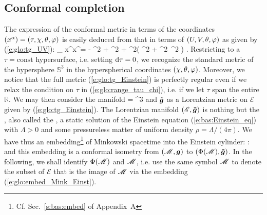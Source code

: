 \subsection{Conformal completion} \label{s:glo:conf_complet_Mink}

The expression of the conformal metric in terms of the coordinates
$(x^\alpha) = (\tau,\chi,\theta,\varphi)$ is easily deduced from that in terms of
$(U,V,\theta,\varphi)$ as given by (\ref{e:glo:tg_UV}):
\be \label{e:glo:tg_Einstein}
    _{\mu\nu} \D x^\mu \D x^\nu =  - \D\tau^2
        + \D \chi^2
        + \sin^2\chi \left(  \D\th^2 + \sin^2\th \, \D\ph^2 \right) .
\ee
Restricting to a $\tau = \mathrm{const}$ hypersurface, i.e. setting $\mathrm{d}\tau=0$,
we recognize the standard metric of the hypersphere
$\mathbb{S}^3$ in the hyperspherical coordinates $(\chi,\theta,\varphi)$.
Moreover, we notice that the full metric (\ref{e:glo:tg_Einstein})
is perfectly regular even if we relax
the condition on $\tau$ in (\ref{e:glo:range_tau_chi}), i.e. if we
let $\tau$ span the
entire $\mathbb{R}$. We may then consider the manifold
\be
     = \times {}^3
\ee
and $\bm{\tilde{g}}$ as a Lorentzian metric on $\mathscr{E}$ given by
(\ref{e:glo:tg_Einstein}).
The Lorentzian manifold
$(\mathscr{E},\bm{\tilde{g}})$ is nothing but the
, also called the ,
a static solution of the Einstein equation (\ref{e:bas:Einstein_eq})
with $\Lambda > 0$ and some pressureless matter of uniform density
$\rho = \Lambda/(4\pi)$.
We have thus an embedding\footnote{Cf. Sec.~\ref{s:bas:embed} of Appendix~A} of Minkowski spacetime into the Einstein cylinder:
\be \label{e:glo:embed_Mink_Einst}
     \Phi:\ \M \longrightarrow {}
\ee
and this embedding is a conformal isometry from
$(\mathscr{M},\bm{g})$ to $(\Phi(\mathscr{M}),\bm{\tilde{g}})$.
In the following, we shall identify $\Phi(\mathscr{M})$ and $\mathscr{M}$, i.e. use the same
symbol $\mathscr{M}$ to denote the subset of $\mathscr{E}$ that is the image of $\mathscr{M}$ via the
embedding (\ref{e:glo:embed_Mink_Einst}).

